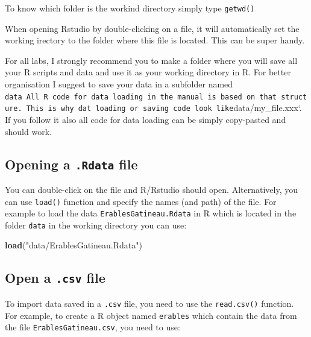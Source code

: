 \documentclass[
  12pt,
]{book}
\makeatletter
\newenvironment{Shaded}{\begin{snugshade}}{\end{snugshade}}
\newcommand{\KeywordTok}[1]{\textcolor[rgb]{0.13,0.29,0.53}{\textbf{#1}}}
\newcommand{\NormalTok}[1]{#1}
\newcommand{\StringTok}[1]{\textcolor[rgb]{0.31,0.60,0.02}{#1}}
\newenvironment{kframe}{%
\medskip{}
\setlength{\fboxsep}{.8em}
\def\at@end@of@kframe{}%
\ifinner\ifhmode%
 \def\at@end@of@kframe{\end{minipage}}%
 \begin{minipage}{\columnwidth}%
\fi\fi%
\def\FrameCommand##1{\hskip\@totalleftmargin \hskip-\fboxsep
\colorbox{incolor}{##1}\hskip-\fboxsep
    \hskip-\linewidth \hskip-\@totalleftmargin \hskip\columnwidth}%
\MakeFramed {\advance\hsize-\width
  \@totalleftmargin\z@ \linewidth\hsize
  \@setminipage}}%
{\par\unskip\endMakeFramed%
\at@end@of@kframe}
\newenvironment{rmdblock}[1]
 {
 \begin{itemize}
 \renewcommand{\labelitemi}{
   \raisebox{-.7\height}[0pt][0pt]{
     {\setkeys{Gin}{width=3em,keepaspectratio}\texttt{[image: images/\#1]}}
   }
 }
 \begin{kframe}
 \setlength{\fboxsep}{1em}
 \item
 }
 {
 \end{kframe}
 \end{itemize}
 }
\newenvironment{rmdimportant}
  {\begin{rmdblock}{important}}
  {\end{rmdblock}}
\newenvironment{rmdtip}
  {\begin{rmdblock}{tip}}
  {\end{rmdblock}}
\makeatother
\begin{document}
To know which folder is the workind directory simply type \texttt{getwd()}

\begin{rmdtip}
When opening Rstudio by double-clicking on a file, it will automatically set the working irectory to the folder where this file is located. This can be super handy.
\end{rmdtip}

\begin{rmdimportant}
For all labs, I strongly recommend you to make a folder where you will save all your R scripts and data and use it as your working directory in R. For better organisation I suggest to save your data in a subfolder named \texttt{data\ All\ R\ code\ for\ data\ loading\ in\ the\ manual\ is\ based\ on\ that\ structure.\ This\ is\ why\ dat\ loading\ or\ saving\ code\ look\ like}data/my\_file.xxx`. If you follow it also all code for data loading can be simply copy-pasted and should work.
\end{rmdimportant}

\hypertarget{opening-a-.rdata-file}{%
\subsection{\texorpdfstring{Opening a \texttt{.Rdata} file}{Opening a .Rdata file}}\label{opening-a-.rdata-file}}

You can double-click on the file and R/Rstudio should open. Alternatively, you can use \texttt{load()} function and specify the names (and path) of the file. For example to load the data \texttt{ErablesGatineau.Rdata} in R which is located in the folder \texttt{data} in the working directory you can use:

\begin{Shaded}
\begin{Highlighting}[]
\KeywordTok{load}\NormalTok{(}\StringTok{"data/ErablesGatineau.Rdata"}\NormalTok{)}
\end{Highlighting}
\end{Shaded}

\hypertarget{open-a-.csv-file}{%
\subsection{\texorpdfstring{Open a \texttt{.csv} file}{Open a .csv file}}\label{open-a-.csv-file}}

To import data saved in a \texttt{.csv} file, you need to use the \texttt{read.csv()} function.
For example, to create a R object named \texttt{erables} which contain the data from the file \texttt{ErablesGatineau.csv}, you need to use:
\end{document}

